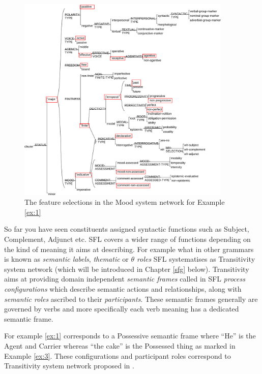 \begin{figure}[!ht]
    \centering      
    \includegraphics[width=0.91\textwidth]{Figures/Example/mood-selections.pdf}      
    \caption{The feature selections in the Mood system network for Example \ref{ex:1}}
    \label{fig:mood-selections}
\end{figure}

So far you have seen constituents assigned syntactic functions such as Subject, Complement, Adjunct etc. SFL covers a wider range of functions depending on the kind of meaning it aims at describing. For example what in other grammars is known as \textit{semantic labels}, \textit{thematic} or \textit{$\theta$ roles} SFL systematises as Transitivity system network (which will be introduced in Chapter \ref{sfg} below). Transitivity aims at providing domain independent \textit{semantic frames} called in SFL \textit{process configurations} which describe semantic actions and relationships, along with \textit{semantic roles} ascribed to their \textit{participants}. These semantic frames generally are governed by verbs and more specifically each verb meaning has a dedicated semantic frame. 

For example \ref{ex:1} corresponds to a Possessive semantic frame where ``He'' is the Agent and Carrier whereas ``the cake'' is the Possessed thing as marked in Example \ref{ex:3}. These configurations and participant roles correspond to Transitivity system network proposed in \citep{Neale2002}.

